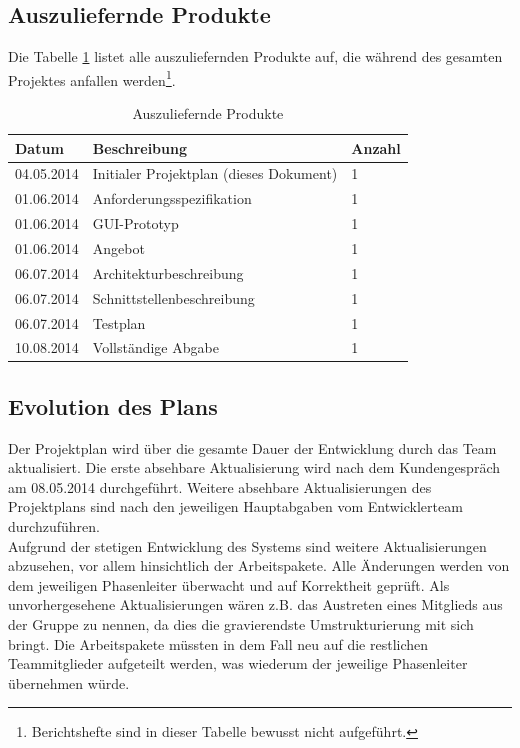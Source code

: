 \documentclass[fontsize=12pt,paper=a4,twoside]{scrartcl}
\begin{document}
\newpage

\subsection{Auszuliefernde Produkte\\}

Die Tabelle \ref{reqProd} listet alle auszuliefernden Produkte auf, die während des gesamten Projektes anfallen werden\footnote{Berichtshefte sind in dieser Tabelle bewusst nicht aufgeführt.}.

\begin{table}[htbp]
\caption{Auszuliefernde Produkte}
\label{reqProd}
\centering
\begin{tabular}{|p{4cm}|p{8cm}|p{2cm}|}
\hline Datum & Beschreibung & Anzahl\\ \hline
\hline 04.05.2014 & Initialer Projektplan (dieses Dokument) & 1\\
\hline 01.06.2014 & Anforderungsspezifikation & 1\\
\hline 01.06.2014 & GUI-Prototyp & 1\\
\hline 01.06.2014 & Angebot & 1\\
\hline 06.07.2014 & Architekturbeschreibung & 1\\
\hline 06.07.2014 & Schnittstellenbeschreibung & 1\\
\hline 06.07.2014 & Testplan & 1\\
\hline 10.08.2014 & Vollständige Abgabe & 1\\
\hline 
\end{tabular}
\end{table}

\subsection{Evolution des Plans}

Der Projektplan wird über die gesamte Dauer der Entwicklung durch das Team aktualisiert. Die erste absehbare Aktualisierung wird nach dem Kundengespräch am 08.05.2014 durchgeführt. Weitere absehbare Aktualisierungen des Projektplans sind nach den jeweiligen Hauptabgaben vom Entwicklerteam durchzuführen. \\
Aufgrund der stetigen Entwicklung des Systems sind weitere Aktualisierungen abzusehen, vor allem hinsichtlich der Arbeitspakete. Alle Änderungen werden von dem jeweiligen Phasenleiter überwacht und auf Korrektheit geprüft. Als unvorhergesehene Aktualisierungen wären z.B. das Austreten eines Mitglieds aus der Gruppe zu nennen, da dies die gravierendste Umstrukturierung mit sich bringt. Die Arbeitspakete müssten in dem Fall neu auf die restlichen Teammitglieder aufgeteilt werden, was wiederum der jeweilige Phasenleiter übernehmen würde.
\end{document}
